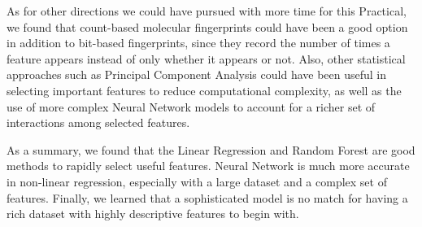 \documentclass[11pt]{article}
\begin{document}
As for other directions we could have pursued with more time for this Practical, we found that count-based molecular fingerprints could have been a good option in addition to bit-based fingerprints, since they record the number of times a feature appears instead of only whether it appears or not. Also, other statistical approaches such as Principal Component Analysis could have been useful in selecting important features to reduce computational complexity, as well as the use of more complex Neural Network models to account for a richer set of interactions among selected features.

As a summary, we found that the Linear Regression and Random Forest are good methods to rapidly select useful features. Neural Network is much more accurate in non-linear regression, especially with a large dataset and a complex set of features. Finally, we learned that a sophisticated model is no match for having a rich dataset with highly descriptive features to begin with.
\end{document}

